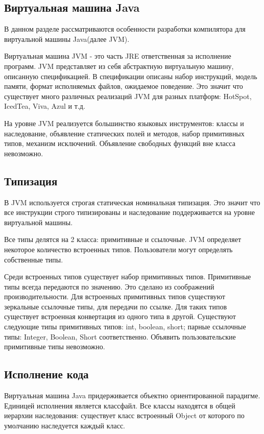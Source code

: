 \subsection{Виртуальная машина Java}
В данном разделе рассматриваются особенности разработки компилятора для виртуальной машины Java(далее JVM).

Виртуальная машина JVM - это часть JRE ответственная за исполнение программ. JVM представляет из себя абстрактную виртуальную машину, описанную спецификацией\cite{jvm:specification}. В спецификации описаны набор инструкций, модель памяти, формат исполняемых файлов, ожидаемое поведение. Это значит что существует много различных реализаций JVM для разных платформ: HotSpot, IcedTea, Viva, Azul и т.д.

На уровне JVM реализуется большинство языковых инструментов: классы и наследование, объявление статических полей и методов, набор примитивных типов, механизм исключений. Объявление свободных функций вне класса невозможно.

\subsection{Типизация}
В JVM используется строгая статическая номинальная типизация. Это значит что все инструкции строго типизированы и наследование поддерживается на уровне виртуальной машины.

Все типы делятся на 2 класса: примитивные и ссылочные. JVM определяет некоторое количество встроенных типов. Пользователи могут определять собственные типы.

Среди встроенных типов существует набор примитивных типов. Примитивные типы всегда передаются по значению. Это сделано из соображений производительности. Для встроенных примитивных типов существуют зеркальные ссылочные типы, для передачи по ссылке. Для таких типов существует встроенная конвертация из одного типа в другой. Существуют следующие типы примитивных типов: int, boolean, short; парные ссылочные типы: Integer, Boolean, Short соответственно. Объявить пользовательские примитивные типы невозможно.

\subsection{Исполнение кода}
Виртуальная машина Java придерживается объектно ориентированной парадигме. Единицей исполнения является классфайл. Все классы находятся в общей иерархии наследования: существует класс встроенный Object от которого по умолчанию наследуется каждый класс.

